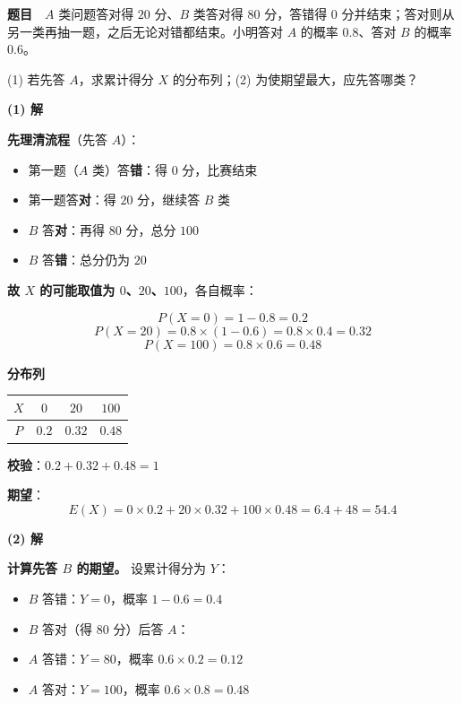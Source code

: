 \par\medskip


\textbf{题目}　$A$ 类问题答对得 $20$ 分、$B$ 类答对得 $80$ 分，答错得 $0$ 分并结束；答对则从另一类再抽一题，之后无论对错都结束。小明答对 $A$ 的概率 $0.8$、答对 $B$ 的概率 $0.6$。

  (1) 若先答 $A$，求累计得分 $X$ 的分布列；(2) 为使期望最大，应先答哪类？

\par\medskip

\textbf{(1) 解}

\textbf{先理清流程}（先答 $A$）：

\begin{itemize}
\item 第一题（$A$ 类）答\textbf{错}：得 $0$ 分，比赛结束
\item 第一题答\textbf{对}：得 $20$ 分，继续答 $B$ 类
\item $B$ 答\textbf{对}：再得 $80$ 分，总分 $100$
\item $B$ 答\textbf{错}：总分仍为 $20$
\end{itemize}

\textbf{故 $X$ 的可能取值为 $0$、$20$、$100$}，各自概率：

\[P(X=0)=1-0.8=0.2\]
\[P(X=20)=0.8\times(1-0.6)=0.8\times0.4=0.32\]
\[P(X=100)=0.8\times0.6=0.48\]

\textbf{分布列}

\begin{center}
\begin{tabular}{cccc}
\toprule
$X$ & $0$ & $20$ & $100$ \\
\midrule
$P$ & $0.2$ & $0.32$ & $0.48$ \\
\bottomrule
\end{tabular}
\end{center}

\textbf{校验}：$0.2+0.32+0.48=1$ 

\textbf{期望}：
\[E(X)=0\times0.2+20\times0.32+100\times0.48=6.4+48=54.4\]

\par\medskip

\textbf{(2) 解}

\textbf{计算先答 $B$ 的期望。} 设累计得分为 $Y$：

\begin{itemize}
\item $B$ 答错：$Y=0$，概率 $1-0.6=0.4$
\item $B$ 答对（得 $80$ 分）后答 $A$：
\item $A$ 答错：$Y=80$，概率 $0.6\times0.2=0.12$
\item $A$ 答对：$Y=100$，概率 $0.6\times0.8=0.48$
\end{itemize}

